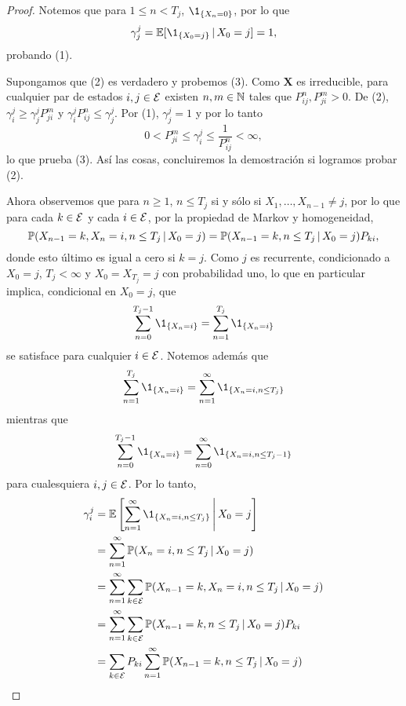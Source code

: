 \begin{proof}
    Notemos que para $1 \leq n < T_j$, $\1_{\{X_n = 0\}}$, por lo que
    \[
        \gamma_j^j = \EE[\1_{\{X_0 = j\}} \,\vert\, X_0 = j] = 1,    
    \]
    probando (1). 
    
    Supongamos que (2) es verdadero y probemos (3). Como $\bm X$ es irreducible, para cualquier par de estados $i, j \in \mathcal{E}$ existen $n, m \in \mathbb{N}$ tales que $P_{ij}^n, P_{ji}^m > 0$. De (2), $\gamma_i^j \geq \gamma_j^j P_{ji}^m$ y $\gamma_i^j P_{ij}^n \leq \gamma_j^j$. Por (1), $\gamma_j^j = 1$ y por lo tanto
    \[
        0 < P_{ji}^m \leq \gamma_i^j \leq \frac 1 {P_{ij}^n} < \infty,    
    \]
    lo que prueba (3). Así las cosas, concluiremos la demostración si logramos probar (2).

    Ahora observemos que para $n \geq 1$, $n \leq T_j$ si y sólo si $X_1, \ldots, X_{n-1} \neq j$, por lo que para cada $k \in \mathcal{E}$ y cada $i \in \mathcal{E}$, por la propiedad de Markov y homogeneidad,
    \[
        \mathbb{P}(X_{n-1} = k, X_n = i, n \leq T_j \,\vert\, X_0 = j) = \mathbb{P}(X_{n-1} = k, n \leq T_j \,\vert\, X_0 = j) P_{ki},
    \]
    donde esto último es igual a cero si $k = j$. Como $j$ es recurrente, condicionado a $X_0 = j$, $T_j < \infty$ y $X_0 = X_{T_j} = j$ con probabilidad uno, lo que en particular implica, condicional en $X_0 = j$, que 
    \[
        \sum_{n = 0}^{T_j - 1} \1_{\{X_n = i\}} = \sum_{n = 1}^{T_j} \1_{\{X_n = i\}}
    \]
    se satisface para cualquier $i \in \mathcal{E}$. Notemos además que
    \[
        \sum_{n = 1}^{T_j} \1_{\{X_n = i\}} = \sum_{n = 1}^\infty \1_{\{X_n = i, n \leq T_j\}}
    \]
    mientras que
    \[
        \sum_{n = 0}^{T_j - 1} \1_{\{X_n = i\}} = \sum_{n = 0}^\infty \1_{\{X_n = i, n \leq T_j - 1\}}    
    \]
    para cualesquiera $i, j \in \mathcal{E}$. Por lo tanto,
    \begin{align*}
        \gamma_i^j & %
        = \EE \left[\sum_{n = 1}^{\infty} \1_{\{X_n = i, n \leq T_j\}} \,\Bigg\vert\, X_0 = j \right] \\
        & = \sum_{n = 1}^\infty \PP(X_n = i, n \leq T_j \,\vert\, X_0 = j) \\
        & = \sum_{n = 1}^\infty \sum_{k \in \Ee} \PP(X_{n-1} = k, X_n = i, n \leq T_j \,\vert\, X_0 = j) \\
        & = \sum_{n = 1}^\infty \sum_{k \in \Ee} \PP(X_{n-1} = k, n \leq T_j \,\vert\, X_0 = j) P_{ki} \\
        & = \sum_{k \in \Ee} P_{ki} \sum_{n = 1}^\infty \PP(X_{n-1} = k, n \leq T_j \,\vert\, X_0 = j) \\

\end{align*}
\end{proof}
